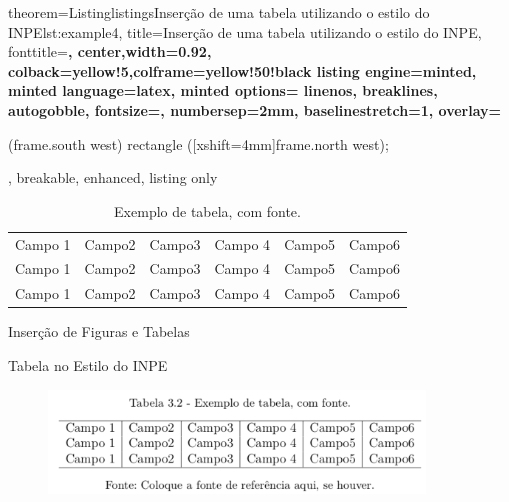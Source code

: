 \documentclass[10pt]{beamer}
\begin{document}
\begin{frame}{}
    \begin{tcblisting}{
        theorem={Listing}{listings}{Inserção de uma tabela utilizando o estilo do INPE}{lst:example4},
        title=Inserção de uma tabela utilizando o estilo do INPE,
        fonttitle=\small\bfseries,
        center,width=0.92\paperwidth,
        colback=yellow!5,colframe=yellow!50!black
        listing engine=minted,
        minted language=latex,
        minted options={%
            linenos,
            breaklines,
            autogobble,
            fontsize=\footnotesize,
            numbersep=2mm,
            baselinestretch=1},
        overlay={%
        \begin{tcbclipinterior}
            \fill[gray!25] (frame.south west) rectangle ([xshift=4mm]frame.north west);
        \end{tcbclipinterior}},
        breakable, enhanced, listing only}
        \begin{table}[H] %
            \begin{center} %
            \caption{Exemplo de tabela, com fonte.}
            \begin{tabular}{l|l|c|c|r|r}
            \hline %
            Campo 1 & Campo2 & Campo3 & Campo 4 & Campo5 & Campo6 \\
            Campo 1 & Campo2 & Campo3 & Campo 4 & Campo5 & Campo6 \\
            Campo 1 & Campo2 & Campo3 & Campo 4 & Campo5 & Campo6 \\
            \hline %
            \end{tabular}
            \end{center}
        \end{table}
    \end{tcblisting}
\end{frame}

\begin{frame}{Inserção de Figuras e Tabelas}
    \begin{block}{Tabela no Estilo do INPE}
        \begin{figure}[H]
          \begin{center}
            \includegraphics[width=10cm]{./figs/exetabestiinpe.pdf}  
          \end{center}
        \end{figure}
    \end{block}
\end{frame}
\end{document}
